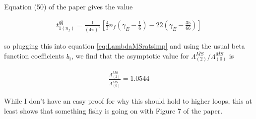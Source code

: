 \documentclass[10pt]{article}
\newcommand{\paren}[1]{ \left( {#1} \right) }
\newcommand{\bracket}[1]{ \left[ {#1} \right] }
\begin{document}
Equation (50) of the paper gives the value

\begin{equation} \label{eq:t1val} \begin{aligned}
t_{1(n_f)}^{q\bar{q}} = \frac{1}{(4\pi)^2}\bracket{\frac{4}{3}n_f\paren{\gamma_E - \frac{1}{6}}-22\paren{\gamma_E-\frac{35}{66}}}
\end{aligned} \end{equation}

so plugging this into equation \ref{eq:LambdaMSratsimp} and using the usual beta function coefficients $b_i$, we find that the asymptotic value for $\Lambda_{(2)}^{\overline{MS}}/ \Lambda_{(0)}^{\overline{MS}} $ is

\begin{equation} \label{eq:result} \begin{aligned}
\frac{\Lambda_{(2)}^{\overline{MS}}}{\Lambda_{(0)}^{\overline{MS}}} = 1.0544
\end{aligned} \end{equation}

While I don't have an easy proof for why this should hold to higher loops, this at least shows that something fishy is going on with Figure 7 of the paper.
\end{document}

